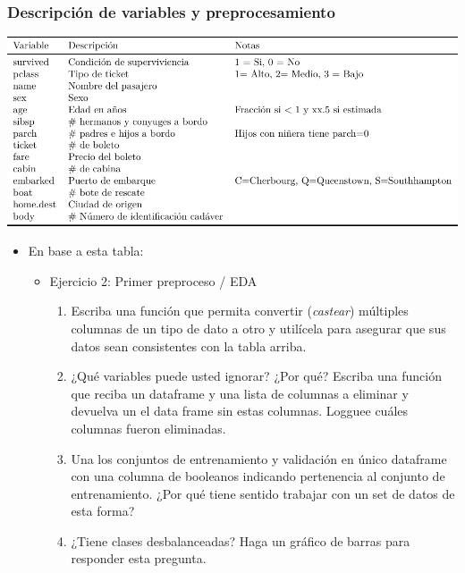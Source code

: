 \documentclass[leqno, 10pt, envcountsect]{beamer}
\numberwithin{equation}{section}
\theoremstyle{definition}
\theoremstyle{example}
\numberwithin{figure}{section}
\numberwithin{table}{section}
\let\olditem\item
\renewcommand{\item}{%
\olditem\vspace{1pt}}
\begin{document}
\begin{frame}
  \frametitle{Descripción de variables y preprocesamiento}
  \begin{center}
    \includegraphics[scale=0.6]{table_variables.pdf}
  \end{center}
  \begin{itemize}
    \item En base a esta tabla:
      \begin{itemize}
        \item Ejercicio 2: Primer preproceso / EDA
          \begin{enumerate}
            \item Escriba una función que permita convertir (\textit{castear})
              múltiples columnas de un tipo de dato a otro y utilícela para
              asegurar que sus datos sean consistentes con la tabla arriba.
            \item ¿Qué variables puede usted ignorar? ¿Por qué? Escriba una
              función que reciba un dataframe y una lista de columnas
              a eliminar y devuelva un el data frame sin estas columnas.
              Logguee cuáles columnas fueron eliminadas.
            \item Una los conjuntos de entrenamiento y validación en único
              dataframe con una columna de booleanos indicando pertenencia al
              conjunto de entrenamiento. ¿Por qué tiene sentido trabajar con un
              set de datos de esta forma?
            \item ¿Tiene clases desbalanceadas? Haga un gráfico de barras para
              responder esta pregunta.
          \end{enumerate}
      \end{itemize}
  \end{itemize}
\end{frame}
\end{document}
